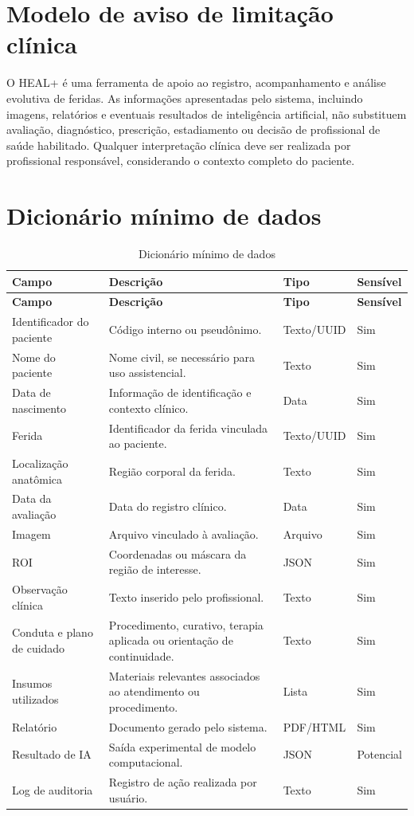 \documentclass[
    12pt,
    oneside,
    a4paper,
    chapter=TITLE,
    brazil,
    sumario=tradicional,
    hidelinks
]{abntex2}
\begin{document}
\chapter{Modelo de aviso de limitação clínica}

O HEAL+ é uma ferramenta de apoio ao registro, acompanhamento e análise evolutiva de feridas. As informações apresentadas pelo sistema, incluindo imagens, relatórios e eventuais resultados de inteligência artificial, não substituem avaliação, diagnóstico, prescrição, estadiamento ou decisão de profissional de saúde habilitado. Qualquer interpretação clínica deve ser realizada por profissional responsável, considerando o contexto completo do paciente.

\chapter{Dicionário mínimo de dados}

\begin{longtable}{L{3.3cm}L{6.7cm}L{2.2cm}L{1.8cm}}
\caption{\label{tab:dicionario-minimo}Dicionário mínimo de dados}\\
\toprule
\textbf{Campo} & \textbf{Descrição} & \textbf{Tipo} & \textbf{Sensível} \\
\midrule
\endfirsthead
\toprule
\textbf{Campo} & \textbf{Descrição} & \textbf{Tipo} & \textbf{Sensível} \\
\midrule
\endhead
Identificador do paciente & Código interno ou pseudônimo. & Texto/UUID & Sim \\
Nome do paciente & Nome civil, se necessário para uso assistencial. & Texto & Sim \\
Data de nascimento & Informação de identificação e contexto clínico. & Data & Sim \\
Ferida & Identificador da ferida vinculada ao paciente. & Texto/UUID & Sim \\
Localização anatômica & Região corporal da ferida. & Texto & Sim \\
Data da avaliação & Data do registro clínico. & Data & Sim \\
Imagem & Arquivo vinculado à avaliação. & Arquivo & Sim \\
ROI & Coordenadas ou máscara da região de interesse. & JSON & Sim \\
Observação clínica & Texto inserido pelo profissional. & Texto & Sim \\
Conduta e plano de cuidado & Procedimento, curativo, terapia aplicada ou orientação de continuidade. & Texto & Sim \\
Insumos utilizados & Materiais relevantes associados ao atendimento ou procedimento. & Lista & Sim \\
Relatório & Documento gerado pelo sistema. & PDF/HTML & Sim \\
Resultado de IA & Saída experimental de modelo computacional. & JSON & Potencial \\
Log de auditoria & Registro de ação realizada por usuário. & Texto & Sim \\
\bottomrule
\end{longtable}
\end{document}
